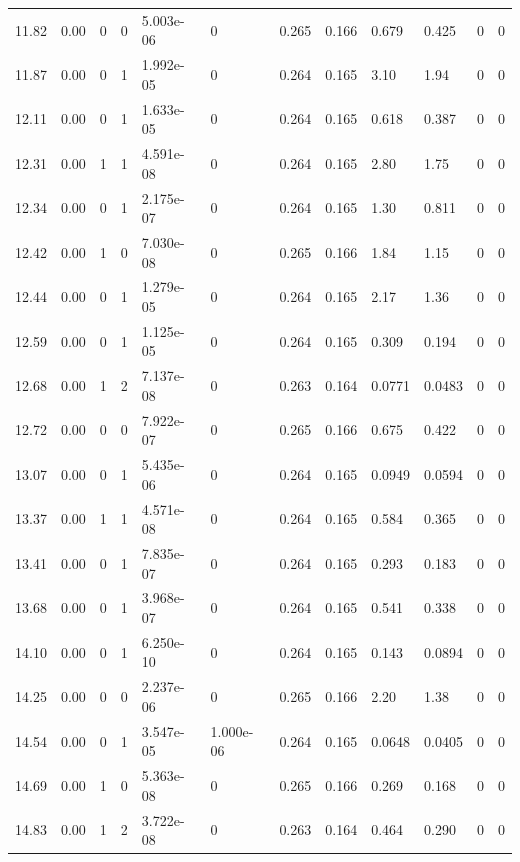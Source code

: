 \documentclass[preview]{standalone}
\begin{document}
{{{\begin{tabular}{L{1.2cm}C{1.2cm} C{0.3cm}C{0.5cm} C{1.4cm}C{1.4cm} C{1.4cm}C{1.4cm} C{1.6cm}C{1.6cm} C{1.6cm}C{1.6cm}}
  11.82  &  0.00  & 0     &  0 &  5.003e-06  & 0  &  0.265&   0.166& 0.679 & 0.425   &  0 & 0  \\ 
  11.87  &  0.00  & 0     &  1 &  1.992e-05  & 0  &  0.264&   0.165& 3.10 & 1.94   &  0 & 0  \\ 
  12.11  &  0.00  & 0     &  1 &  1.633e-05  & 0  &  0.264&   0.165& 0.618 & 0.387   &  0 & 0  \\ 
  12.31  &  0.00  & 1     &  1 &  4.591e-08  & 0  &  0.264&   0.165& 2.80 & 1.75   &  0 & 0  \\ 
  12.34  &  0.00  & 0     &  1 &  2.175e-07  & 0  &  0.264&   0.165& 1.30 & 0.811   &  0 & 0  \\ 
  12.42  &  0.00  & 1     &  0 &  7.030e-08  & 0  &  0.265&   0.166& 1.84 & 1.15   &  0 & 0  \\ 
  12.44  &  0.00  & 0     &  1 &  1.279e-05  & 0  &  0.264&   0.165& 2.17 & 1.36   &  0 & 0  \\ 
  12.59  &  0.00  & 0     &  1 &  1.125e-05  & 0  &  0.264&   0.165& 0.309 & 0.194   &  0 & 0  \\ 
  12.68  &  0.00  & 1     &  2 &  7.137e-08  & 0  &  0.263&   0.164& 0.0771 & 0.0483   &  0 & 0  \\ 
  12.72  &  0.00  & 0     &  0 &  7.922e-07  & 0  &  0.265&   0.166& 0.675 & 0.422   &  0 & 0  \\ 
  13.07  &  0.00  & 0     &  1 &  5.435e-06  & 0  &  0.264&   0.165& 0.0949 & 0.0594   &  0 & 0  \\ 
  13.37  &  0.00  & 1     &  1 &  4.571e-08  & 0  &  0.264&   0.165& 0.584 & 0.365   &  0 & 0  \\ 
  13.41  &  0.00  & 0     &  1 &  7.835e-07  & 0  &  0.264&   0.165& 0.293 & 0.183   &  0 & 0  \\ 
  13.68  &  0.00  & 0     &  1 &  3.968e-07  & 0  &  0.264&   0.165& 0.541 & 0.338   &  0 & 0  \\ 
  14.10  &  0.00  & 0     &  1 &  6.250e-10  & 0  &  0.264&   0.165& 0.143 & 0.0894   &  0 & 0  \\ 
  14.25  &  0.00  & 0     &  0 &  2.237e-06  & 0  &  0.265&   0.166& 2.20 & 1.38   &  0 & 0  \\ 
  14.54  &  0.00  & 0     &  1 &  3.547e-05  & 1.000e-06  &  0.264&   0.165& 0.0648 & 0.0405   &  0 & 0  \\ 
  14.69  &  0.00  & 1     &  0 &  5.363e-08  & 0  &  0.265&   0.166& 0.269 & 0.168   &  0 & 0  \\ 
  14.83  &  0.00  & 1     &  2 &  3.722e-08  & 0  &  0.263&   0.164& 0.464 & 0.290   &  0 & 0  \\ 

\end{tabular}}}}
\end{document}
